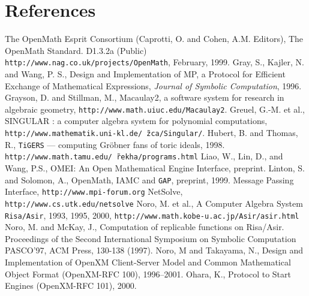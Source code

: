 
\section*{References}
\begin{thebibliography}{X}
The OpenMath Esprit Consortium 
(Caprotti, O. and Cohen, A.M. Editors),
The OpenMath Standard. D1.3.2a (Public) \\
{\small {\tt http://www.nag.co.uk/projects/OpenMath}},
February, 1999.
Gray, S., Kajler, N. and Wang, P. S.,
Design and Implementation of MP, a Protocol for Efficient
  Exchange of Mathematical Expressions,
{\sl Journal of Symbolic Computation}, 1996.
Grayson, D. and Stillman, M.,
Macaulay2, a software system for research in algebraic geometry,
 {\small {\tt http://www.math.uiuc.edu/Macaulay2}}.
Greuel, G.-M. et al., SINGULAR : a computer algebra system for polynomial
computations,
{\small {\tt http://www.mathematik.uni-kl.de/\~\,zca/Singular/}}.
Hubert, B. and Thomas, R.,
{\tt TiGERS} --- computing Gr\"obner fans of toric
ideals, 1998.
{\small
{\tt http://www.math.tamu.edu/\~\,rekha/programs.html}}
Liao, W., Lin, D., and Wang, P.S.,
{OMEI: An Open Mathematical Engine Interface},
preprint.
Linton, S. and Solomon, A.,
OpenMath, IAMC and {\tt GAP},
preprint, 1999.
 Message Passing Interface,
{\small {\tt http://www.mpi-forum.org}} 
NetSolve, {\small {\tt http://www.cs.utk.edu/netsolve}}
Noro, M. et al., 
A Computer Algebra System {\tt Risa/Asir},  1993, 1995, 2000,
{\small {\tt http://www.math.kobe-u.ac.jp/Asir/asir.html}}
Noro, M. and McKay, J.,
Computation of replicable functions on Risa/Asir.
Proceedings of the Second International Symposium on
Symbolic Computation PASCO'97, ACM Press, 130-138 (1997).
Noro, M and Takayama, N., Design and Implementation
of OpenXM Client-Server Model and Common Mathematical Object Format
(OpenXM-RFC 100), 1996--2001.
Ohara, K.,
Protocol to Start Engines (OpenXM-RFC 101),
2000.

\end{thebibliography}
